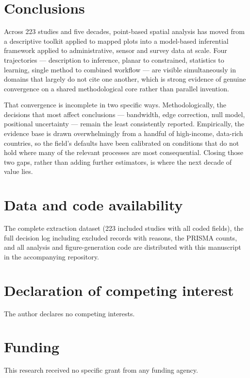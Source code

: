\documentclass[11pt,a4paper]{article}
\begin{document}
\section{Conclusions}
Across 223 studies and five decades, point-based spatial analysis has moved
from a descriptive toolkit applied to mapped plots into a model-based
inferential framework applied to administrative, sensor and survey data at
scale. Four trajectories --- description to inference, planar to constrained,
statistics to learning, single method to combined workflow --- are visible
simultaneously in domains that largely do not cite one another, which is
strong evidence of genuine convergence on a shared methodological core rather
than parallel invention.

That convergence is incomplete in two specific ways. Methodologically, the
decisions that most affect conclusions --- bandwidth, edge correction, null
model, positional uncertainty --- remain the least consistently reported.
Empirically, the evidence base is drawn overwhelmingly from a handful of
high-income, data-rich countries, so the field's defaults have been calibrated
on conditions that do not hold where many of the relevant processes are most
consequential. Closing those two gaps, rather than adding further estimators,
is where the next decade of value lies.

\section*{Data and code availability}
The complete extraction dataset (223 included studies with all coded fields),
the full decision log including excluded records with reasons, the PRISMA
counts, and all analysis and figure-generation code are distributed with this
manuscript in the accompanying repository.

\section*{Declaration of competing interest}
The author declares no competing interests.

\section*{Funding}
This research received no specific grant from any funding agency.
\end{document}
